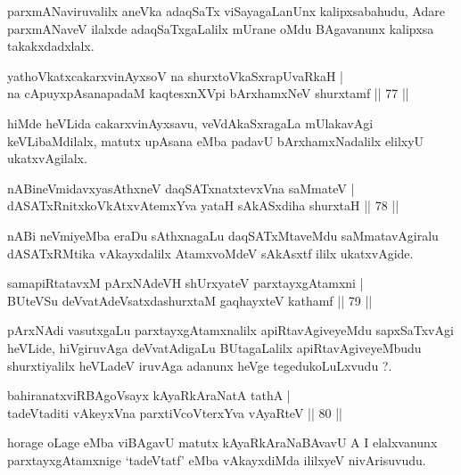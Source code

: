 \begin{artha}
parxmANaviruvalilx aneVka adaqSaTx viSayagaLanUnx kalipxsabahudu, Adare parxmANaveV ilalxde adaqSaTxgaLalilx mUrane oMdu BAgavanunx kalipxsa takakxdadxlalx.
\end{artha}


\begin{shl}
yathoVkatxcakarxvinAyxsoV na shurxtoV\s kaSxrapUvaRkaH |\\
na cApuyxpAsanapadaM kaqtesxnXV\s pi bArxhamxNeV shurxtamf \hfill || 77 ||
\end{shl}

\begin{artha}
hiMde heVLida cakarxvinAyxsavu, veVdAkaSxragaLa mUlakavAgi keVLibaMdilalx, matutx upAsana eMba padavU bArxhamxNadalilx elilxyU ukatxvAgilalx.
\end{artha}

\begin{shl}
nABineVmidavxyasAthxneV daqSATxnatxtevxVna saMmateV |\\
dASATxRnitxkoVkAtxvAtemxYva yataH sAkASxdiha shurxtaH \hfill || 78 ||
\end{shl}

\begin{artha}
nABi neVmiyeMba eraDu sAthxnagaLu daqSATxMtaveMdu saMmatavAgiralu dASATxRMtika vAkayxdalilx AtamxvoMdeV sAkAsxtf ililx ukatxvAgide.
\end{artha}

\begin{shl}
samapiRtatavxM pArxNAdeVH shUrxyateV parxtayxgAtamxni |\\
BUteVSu deVvatAdeVsatxdashurxtaM gaqhayxteV kathamf \hfill || 79 ||
\end{shl}

\begin{artha}
pArxNAdi vasutxgaLu parxtayxgAtamxnalilx apiRtavAgiveyeMdu sapxSaTxvAgi heVLide, hiVgiruvAga deVvatAdigaLu BUtagaLalilx apiRtavAgiveyeMbudu shurxtiyalilx heVLadeV iruvAga adanunx heVge tegedukoLuLxvudu ?.
\end{artha}

\begin{shl}
bahiranatxviRBAgoV\s sayx kAyaRkAraNatA tathA |\\
tadeVtaditi vAkeyxVna parxtiVcoV\s terxYva vAyaRteV \hfill || 80 ||
\end{shl}

\begin{artha}
horage oLage eMba viBAgavU matutx kAyaRkAraNaBAvavU A I elalxvanunx parxtayxgAtamxnige `tadeVtatf' eMba vAkayxdiMda ililxyeV nivArisuvudu.
\end{artha}

